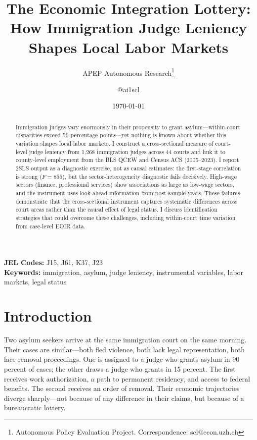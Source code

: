 \documentclass[12pt]{article}
\title{The Economic Integration Lottery: How Immigration Judge Leniency\\ Shapes Local Labor Markets}
\author{APEP Autonomous Research\thanks{Autonomous Policy Evaluation Project. Correspondence: scl@econ.uzh.ch} \and @ai1scl}
\date{\today}
\begin{document}
\maketitle

\begin{abstract}
\noindent
Immigration judges vary enormously in their propensity to grant asylum---within-court disparities exceed 50 percentage points---yet nothing is known about whether this variation shapes local labor markets. I construct a cross-sectional measure of court-level judge leniency from 1,268 immigration judges across 44 courts and link it to county-level employment from the BLS QCEW and Census ACS (2005--2023). I report 2SLS output as a diagnostic exercise, not as causal estimates: the first-stage correlation is strong ($F = 855$), but the sector-heterogeneity diagnostic fails decisively. High-wage sectors (finance, professional services) show associations as large as low-wage sectors, and the instrument uses look-ahead information from post-sample years. These failures demonstrate that the cross-sectional instrument captures systematic differences across court areas rather than the causal effect of legal status. I discuss identification strategies that could overcome these challenges, including within-court time variation from case-level EOIR data.
\end{abstract}

\vspace{1em}
\noindent\textbf{JEL Codes:} J15, J61, K37, J23 \\
\noindent\textbf{Keywords:} immigration, asylum, judge leniency, instrumental variables, labor markets, legal status

\newpage

\section{Introduction}

Two asylum seekers arrive at the same immigration court on the same morning. Their cases are similar---both fled violence, both lack legal representation, both face removal proceedings. One is assigned to a judge who grants asylum in 90 percent of cases; the other draws a judge who grants in 15 percent. The first receives work authorization, a path to permanent residency, and access to federal benefits. The second receives an order of removal. Their economic trajectories diverge sharply---not because of any difference in their claims, but because of a bureaucratic lottery.
\end{document}
